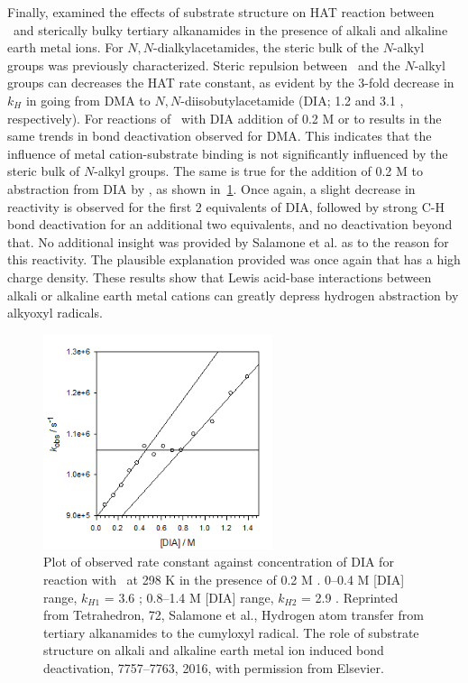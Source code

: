 \begin{doublespace}
Finally, \citet{Salamone2016} examined the effects of substrate structure on HAT
reaction between \cumo\ and sterically bulky tertiary alkanamides in the
presence of alkali and alkaline earth metal ions. For $N,N$-dialkylacetamides,
the steric bulk of the $N$-alkyl groups was previously
characterized.\cite{Salamone2014} Steric repulsion between \cumo\ and the
$N$-alkyl groups can decreases the HAT rate constant, as evident by the 3-fold
decrease in $k_H$ in going from DMA to $N,N$-diisobutylacetamide (DIA; 1.2
and 3.1 \Ms, respectively). For reactions of \cumo\ with DIA addition of
0.2 M  or  to results in the same trends in 
bond deactivation observed for DMA. This indicates that the influence of metal
cation-substrate binding is not significantly influenced by the steric bulk of
$N$-alkyl groups.  The same is true for the addition of 0.2 M  to
abstraction from DIA by \cumo, as shown in~\ref{fig:k-dia-mg}. Once again, a
slight decrease in reactivity is observed for the first 2 equivalents of DIA,
followed by strong C-H bond deactivation for an additional two equivalents, and
no deactivation beyond that. No additional insight was provided by Salamone et
al. as to the reason for this reactivity. The plausible explanation provided was
once again that  has a high charge density. These results show that
Lewis acid-base interactions between alkali or alkaline earth metal cations can
greatly depress hydrogen abstraction by alkyoxyl radicals.

\begin{figure}[!htbp]
  \includegraphics[width=0.6\textwidth]{figures/exptdia-mg.png}
  \caption[Plot of observed rate constant against concentration of DIA for
  reaction with \cumo\ at 298 K in the presence of 0.2 M .]{Plot
	  of observed rate constant against concentration of DIA for reaction
	  with \cumo\ at 298 K in the presence of 0.2 M . 0--0.4
	  M [DIA] range, $k_{H1}$ = 3.6 \Ms; 0.8--1.4 M [DIA] range,
	  $k_{H2}$ = 2.9 \Ms.  Reprinted from Tetrahedron, 72, Salamone et
  al., Hydrogen atom transfer from tertiary alkanamides to the cumyloxyl
  radical. The role of substrate structure on alkali and alkaline earth metal
  ion induced  bond deactivation, 7757--7763, 2016, with permission
  from Elsevier.} \label{fig:k-dia-mg}
\end{figure}


\end{doublespace}
